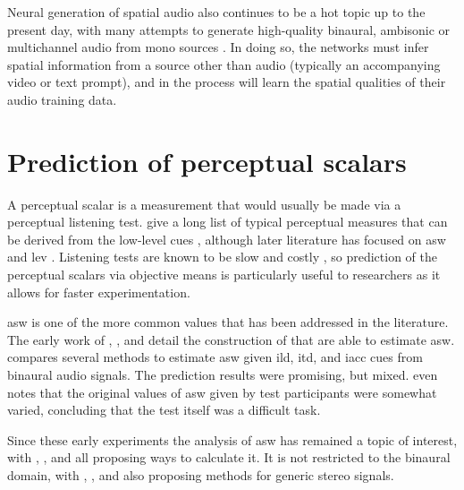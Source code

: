 Neural generation of spatial audio also continues to be a hot topic up to the present day, with many attempts to generate high-quality binaural, ambisonic or multichannel audio from mono sources \cite{limEnhancingSpatialAudio2024,liCyclicLearningBinaural2024,liTASPersonalizedTextguided2024,chenCCStereoAudioVisualContextual2025,melechovskySonicMasterControllableAllinOne2025,santosLargeScaleSelfSupervisedLearning2025,wangSpatialV2AVisualGuidedHighfidelity2026}. In doing so, the networks must infer spatial information from a source other than audio (typically an accompanying video or text prompt), and in the process will learn the spatial qualities of their audio training data.

\section{Prediction of perceptual scalars}
\label{sec:prediction_of_perceptual_scalars}
A perceptual scalar is a measurement that would usually be made via a perceptual listening test.   give a long list of typical perceptual measures that can be derived from the low-level cues \cite{bergSystematicEvaluationPerceived2003}, although later literature has focused on \gls{asw} and \gls{lev} \cite{rumseySpatialAudioSensory2006}. Listening tests are known to be slow and costly \cite{rumseySpatialQualityEvaluation2002}, so prediction of the perceptual scalars via objective means is particularly useful to researchers as it allows for faster experimentation.

\gls{asw} is one of the more common values that has been addressed in the literature. The early work of , , and  detail the construction of  that are able to estimate \gls{asw}. \citeauthor{dewhirstModellingPerceivedSpatial2008} compares several methods to estimate \gls{asw} given \gls{ild}, \gls{itd}, and \gls{iacc} cues from binaural audio signals. The prediction results were promising, but mixed. \citeauthor{dewhirstModellingPerceivedSpatial2008} even notes that the original values of \gls{asw} given by test participants were somewhat varied, concluding that the test itself was a difficult task.

Since these early experiments the analysis of \gls{asw} has remained a topic of interest, with , , and  all proposing ways to calculate it. It is not restricted to the binaural domain, with , , and  also proposing methods for generic stereo signals. 

